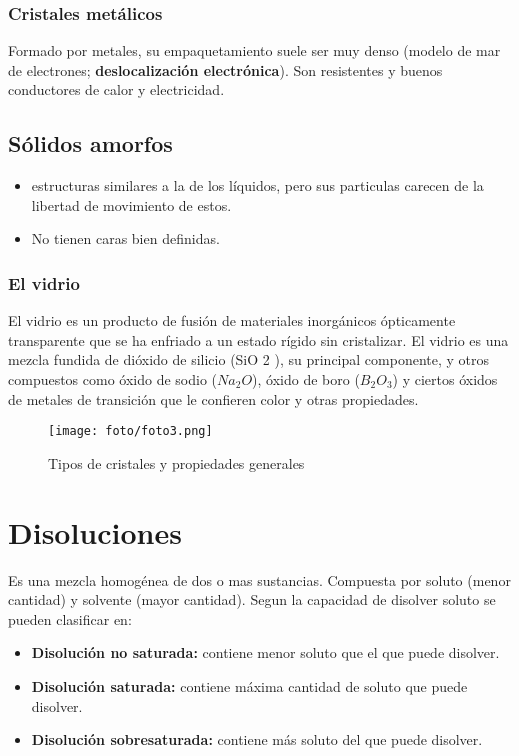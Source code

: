 \documentclass[]{article}
\begin{document}
\subsubsection{Cristales metálicos}
Formado por metales, su empaquetamiento suele ser muy denso (modelo de mar de electrones; \textbf{deslocalización electrónica}). Son resistentes y buenos conductores de calor y electricidad.


\subsection{Sólidos amorfos}

\begin{itemize}
	\item estructuras similares a la de los líquidos, pero sus particulas carecen de la libertad de movimiento de estos.
	\item No tienen caras bien definidas.
\end{itemize}



\subsubsection{El vidrio}
El vidrio es un producto de fusión de materiales inorgánicos ópticamente transparente que se ha enfriado a un estado rígido sin cristalizar.
El vidrio es una mezcla fundida de dióxido de silicio (SiO 2 ), su principal componente, y
otros compuestos como óxido de sodio ($Na_2O$), óxido de boro ($B_2O_3$) y ciertos óxidos de
metales de transición que le confieren color y otras propiedades.

\begin{figure}[H]
\center
\texttt{[image: foto/foto3.png]}
\caption{Tipos de cristales y propiedades generales}
\end{figure}



\section{Disoluciones}
Es una mezcla homogénea de dos o mas sustancias. Compuesta por soluto (menor cantidad) y solvente (mayor cantidad). Segun la capacidad de disolver soluto se pueden clasificar en:

\begin{itemize}
	\item \textbf{Disolución no saturada:} contiene menor soluto que el que puede disolver.
	\item \textbf{Disolución saturada:} contiene máxima cantidad de soluto que puede disolver.
	\item \textbf{Disolución sobresaturada:} contiene más soluto del que puede disolver.
\end{itemize}
\end{document}
